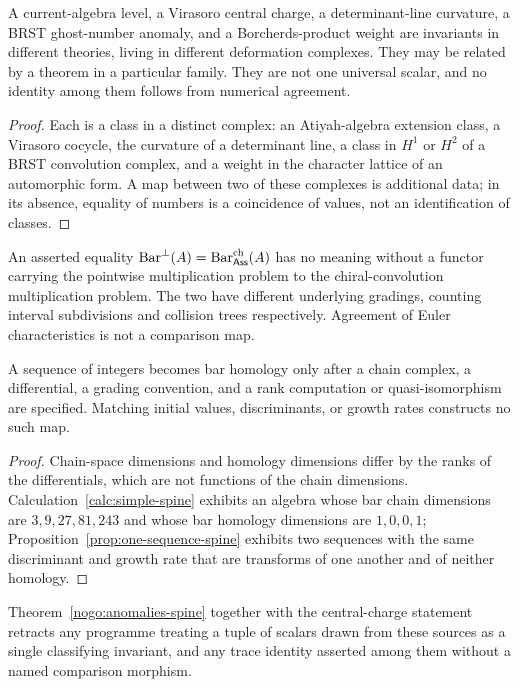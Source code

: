 \begin{theorem}
\label{nogo:anomalies-spine}
A current-algebra level, a Virasoro central charge, a determinant-line
curvature, a BRST ghost-number anomaly, and a Borcherds-product weight are
invariants in different theories, living in different deformation complexes.
They may be related by a theorem in a particular family. They are not one
universal scalar, and no identity among them follows from numerical agreement.
\end{theorem}
\begin{proof}
Each is a class in a distinct complex: an Atiyah-algebra extension class, a
Virasoro cocycle, the curvature of a determinant line, a class in $H^1$ or
$H^2$ of a BRST convolution complex, and a weight in the character lattice of
an automorphic form. A map between two of these complexes is additional data;
in its absence, equality of numbers is a coincidence of values, not an
identification of classes.
\end{proof}

\begin{theorem}
An asserted equality $\operatorname{Bar}^{\perp}(A)=\operatorname{Bar}^{\mathrm{ch}}_{\mathsf{Ass}}(A)$ has no meaning without a
functor carrying the pointwise multiplication problem to the chiral-convolution
multiplication problem. The two have different underlying gradings, counting
interval subdivisions and collision trees respectively. Agreement of Euler
characteristics is not a comparison map.
\end{theorem}

\begin{theorem}
\label{nogo:scalar-spine}
A sequence of integers becomes bar homology only after a chain complex, a
differential, a grading convention, and a rank computation or quasi-isomorphism
are specified. Matching initial values, discriminants, or growth rates
constructs no such map.
\end{theorem}
\begin{proof}
Chain-space dimensions and homology dimensions differ by the ranks of the
differentials, which are not functions of the chain dimensions.
Calculation~\ref{calc:simple-spine} exhibits an algebra whose bar chain
dimensions are $3,9,27,81,243$ and whose bar homology dimensions are $1,0,0,1$;
Proposition~\ref{prop:one-sequence-spine} exhibits two sequences with the same
discriminant and growth rate that are transforms of one another and of neither
homology.
\end{proof}

Theorem~\ref{nogo:anomalies-spine} together with the central-charge statement
retracts any programme treating a tuple of scalars drawn from these sources as
a single classifying invariant, and any trace identity asserted among them
without a named comparison morphism.
